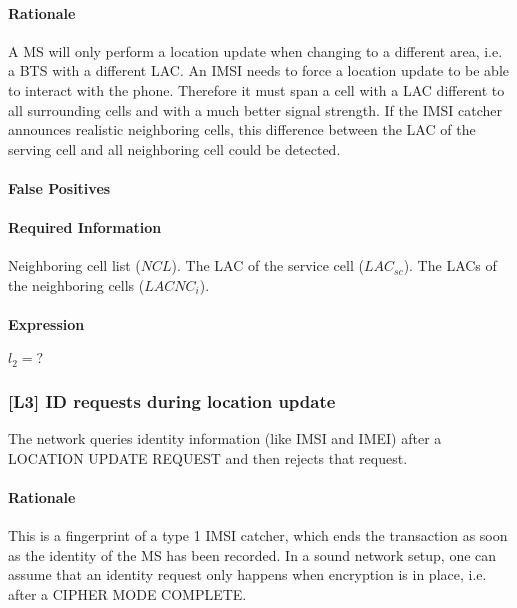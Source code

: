 \documentclass[a4paper,11pt,notitlepage,bigheadings,oneside]{scrartcl}
\begin{document}
\paragraph{Rationale}

A MS will only perform a location update when changing to a different area,
i.e. a BTS with a different LAC. An IMSI needs to force a location update to be
able to interact with the phone. Therefore it must span a cell with a LAC
different to all surrounding cells and with a much better signal strength. If
the IMSI catcher announces realistic neighboring cells, this difference between
the LAC of the serving cell and all neighboring cell could be detected.

\paragraph{False Positives}

\TBD{}

\paragraph{Required Information}

Neighboring cell list ($NCL$). The LAC of the service cell ($LAC_{sc}$). The
LACs of the neighboring cells ($LACNC_i$).

\paragraph{Expression}

$l_2 = ?$


\subsubsection{[L3] ID requests during location update}

The network queries identity information (like IMSI and IMEI) after a LOCATION
UPDATE REQUEST and then rejects that request.

\paragraph{Rationale}

This is a fingerprint of a type 1 IMSI catcher, which ends the transaction as
soon as the identity of the MS has been recorded. In a sound network setup, one
can assume that an identity request only happens when encryption is in place,
i.e. after a CIPHER MODE COMPLETE.
\end{document}
